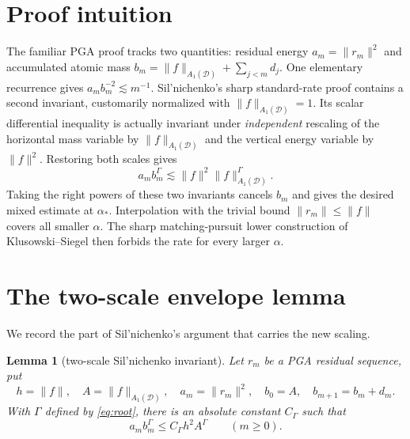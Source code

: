 \documentclass[11pt]{article}
\newtheorem{lemma}[theorem]{Lemma}
\newcommand{\Aone}{A_1(\mathcal D)}
\begin{document}
\section{Proof intuition}

The familiar PGA proof tracks two quantities: residual energy
$a_m=\|r_m\|^2$ and accumulated atomic mass
$b_m=\|f\|_{\Aone}+\sum_{j<m}d_j$.  One elementary recurrence gives
$a_mb_m^{-2}\lesssim m^{-1}$.  Sil'nichenko's sharp standard-rate proof
contains a second invariant, customarily normalized with
$\|f\|_{\Aone}=1$.  Its scalar differential inequality is actually
invariant under \emph{independent} rescaling of the horizontal mass variable
by $\|f\|_{\Aone}$ and the vertical energy variable by $\|f\|^2$.  Restoring
both scales gives
\[
 a_mb_m^\Gamma\lesssim
 \|f\|^2\|f\|_{\Aone}^{\Gamma}.
\]
Taking the right powers of these two invariants cancels $b_m$ and gives the
desired mixed estimate at $\alpha_*$.  Interpolation with the trivial bound
$\|r_m\|\leq\|f\|$ covers all smaller $\alpha$.  The sharp matching-pursuit
lower construction of Klusowski--Siegel then forbids the rate for every
larger $\alpha$.

\section{The two-scale envelope lemma}

We record the part of Sil'nichenko's argument that carries the new scaling.

\begin{lemma}[two-scale Sil'nichenko invariant]\label{lem:envelope}
Let $r_m$ be a PGA residual sequence, put
\[
 h=\|f\|,\quad A=\|f\|_{\Aone},\quad
 a_m=\|r_m\|^2,\quad b_0=A,\quad b_{m+1}=b_m+d_m.
\]
With $\Gamma$ defined by \eqref{eq:root}, there is an absolute constant
$C_\Gamma$ such that
\begin{equation}\label{eq:secondinv}
 a_m b_m^\Gamma\leq C_\Gamma h^2A^\Gamma
 \qquad(m\geq0).
\end{equation}
\end{lemma}
\end{document}
